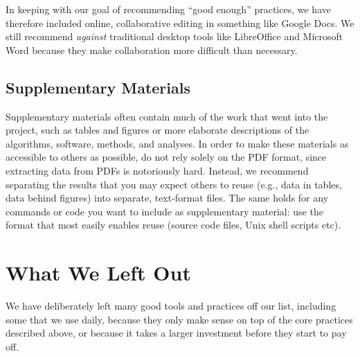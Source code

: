 \documentclass[10pt]{article}
\begin{document}
In keeping with our goal of recommending ``good enough'' practices, we
have therefore included online, collaborative editing in something like Google
Docs. We still recommend \emph{against} traditional desktop tools like
LibreOffice and Microsoft Word because they make collaboration more
difficult than necessary.

\subsection*{Supplementary Materials}

Supplementary materials often contain much of the work that went into
the project, such as tables and figures or more elaborate descriptions
of the algorithms, software, methods, and analyses. In order to make
these materials as accessible to others as possible, do not rely
solely on the PDF format, since extracting data from PDFs is
notoriously hard.  Instead, we recommend separating the results that
you may expect others to reuse (e.g., data in tables, data behind
figures) into separate, text-format files. The same holds for any
commands or code you want to include as supplementary material: use
the format that most easily enables reuse (source code files, Unix
shell scripts etc).

\section{What We Left Out}\label{sec:omitted}

We have deliberately left many good tools and practices off our list,
including some that we use daily, because they only make sense on top
of the core practices described above, or because it takes a larger
investment before they start to pay off.
\end{document}
